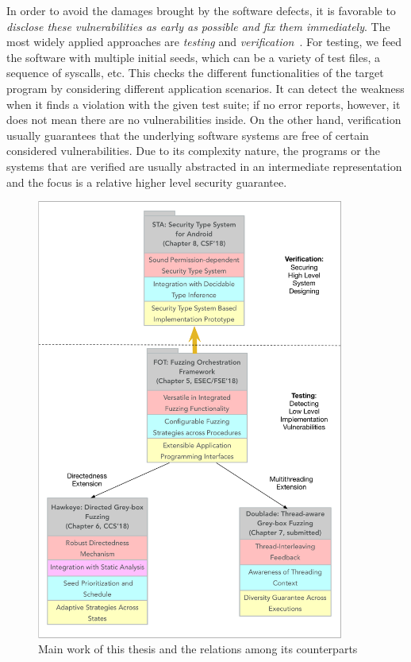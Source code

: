 In order to avoid the damages brought by the software defects, it is favorable to \emph{disclose these vulnerabilities as early as possible and fix them immediately}. The most widely applied approaches are \emph{testing} and \emph{verification}~\cite{Hailpern:2002:SDT:1660992.1660994,Felderer:2016:MST:2904681.2904685,mc-at}. For testing, we feed the software with multiple initial seeds, which can be a variety of test files, a sequence of syscalls, etc. This checks the different functionalities of the target program by considering different application scenarios. It can detect the weakness when it finds a violation with the given test suite; if no error reports, however, it does not mean there are no vulnerabilities inside. On the other hand, verification usually guarantees that the underlying software systems are free of certain considered vulnerabilities. Due to its complexity nature, the programs or the systems that are verified are usually abstracted in an intermediate representation and the focus is a relative higher level security guarantee.

\begin{figure}[ht]
	\begin{center}
		\includegraphics[width=0.9\textwidth]{res/contributions}
		\caption{Main work of this thesis and the relations among its counterparts}
		\label{fig:works}
	\end{center}
\end{figure}


